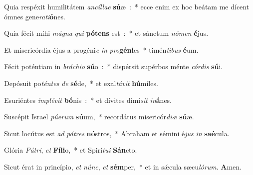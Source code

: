﻿\item Quia respéxit humilitátem \emph{an}\emph{cíl}\emph{lae} \textbf{sú}æ~:~* ecce enim ex hoc beátam me dícent ómnes gene\emph{ra}\emph{ti}\textbf{ó}nes.
\item Quia fécit míhi \emph{má}\emph{gna} \emph{qui} \textbf{pó}\textbf{tens} est~:~* et sánctum \emph{nó}\emph{men} \textbf{é}jus.
\item Et misericórdia éjus a progéni\emph{e} \emph{in} \emph{pro}\textbf{gé}\textbf{ni}es~* timén\emph{ti}\emph{bus} \textbf{é}um.
\item Fécit poténtiam in \emph{brá}\emph{chi}\emph{o} \textbf{sú}o~:~* dispérsit supérbos ménte \emph{cór}\emph{dis} \textbf{sú}i.
\item Depósuit po\emph{tén}\emph{tes} \emph{de} \textbf{sé}de,~* et exal\emph{tá}\emph{vit} \textbf{hú}miles.
\item Esuriéntes \emph{im}\emph{plé}\emph{vit} \textbf{bó}nis~:~* et dívites dimí\emph{sit} \emph{in}\textbf{á}nes.
\item Suscépit Israel \emph{pú}\emph{e}\emph{rum} \textbf{sú}um,~* recordátus misericór\emph{di}\emph{æ} \textbf{sú}æ.
\item Sicut locútus est \emph{ad} \emph{pá}\emph{tres} \textbf{nó}stros,~* Abraham et sémini é\emph{jus} \emph{in} \textbf{saé}cula.
\item Glória \emph{Pá}\emph{tri}, \emph{et} \textbf{Fí}\textbf{li}o,~* et Spirí\emph{tu}\emph{i} \textbf{Sán}cto.
\item Sicut érat in princípio, \emph{et} \emph{núnc}, \emph{et} \textbf{sém}per,~* et in sǽcula sæcu\emph{ló}\emph{rum}. \textbf{A}men.